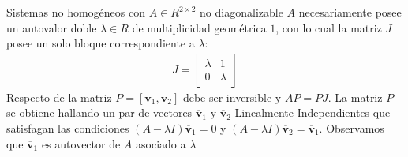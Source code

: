 \documentclass[a4paper, twoside]{article}
\numberwithin{equation}{section}
\numberwithin{figure}{section}
\numberwithin{table}{section}
\newcommand{\vect}[1]{\overline{\textbf{#1}}}
\begin{document}
\begin{corolario*}{Sistemas no homogéneos con $A \in R^{2 \times 2}$ no diagonalizable}
	$A$ necesariamente posee un autovalor doble $\lambda \in R$ de multiplicidad geométrica $1$, con lo cual la matriz $J$ posee un solo bloque correspondiente a $\lambda$:
	\begin{align}
		J=\begin{bmatrix} {\lambda}&{1} \\ {0}&{\lambda} \end{bmatrix}
	\end{align}
	Respecto de la matriz $P=[\vect{v}_1,\vect{v}_2]$ debe ser inversible y $AP=PJ$. La matriz $P$ se obtiene hallando un par de vectores $\vect{v}_1$ y $\vect{v}_2$ Linealmente Independientes que satisfagan las condiciones $\left( A-\lambda I \right)\vect{v}_1=0$ y $\left( A-\lambda I \right)\vect{v}_2=\vect{v}_1$. Observamos que $\vect{v}_1$ es autovector de $A$ asociado a $\lambda$
\end{corolario*}
\end{document}
